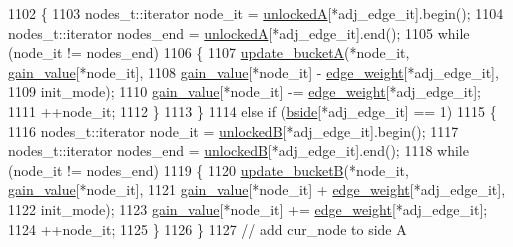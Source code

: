 \begin{DoxyCode}
1102     \{
1103         nodes\_t::iterator node\_it = \mbox{\hyperlink{classratio__cut__partition_a9e4d0ba86475bd0faa98e01c6be4dde0}{unlockedA}}[*adj\_edge\_it].begin();
1104         nodes\_t::iterator nodes\_end = \mbox{\hyperlink{classratio__cut__partition_a9e4d0ba86475bd0faa98e01c6be4dde0}{unlockedA}}[*adj\_edge\_it].end();
1105         \textcolor{keywordflow}{while} (node\_it != nodes\_end)
1106         \{
1107         \mbox{\hyperlink{classratio__cut__partition_acbd0608a7e5560a52c447711cb59a644}{update\_bucketA}}(*node\_it, \mbox{\hyperlink{classratio__cut__partition_af24ff191abbb0578f0bfc54fef5f6d45}{gain\_value}}[*node\_it],
1108             \mbox{\hyperlink{classratio__cut__partition_af24ff191abbb0578f0bfc54fef5f6d45}{gain\_value}}[*node\_it] - \mbox{\hyperlink{classratio__cut__partition_a48a85c82fb09b83c9d494d6d1232fab2}{edge\_weight}}[*adj\_edge\_it],
1109             init\_mode);
1110         \mbox{\hyperlink{classratio__cut__partition_af24ff191abbb0578f0bfc54fef5f6d45}{gain\_value}}[*node\_it] -= \mbox{\hyperlink{classratio__cut__partition_a48a85c82fb09b83c9d494d6d1232fab2}{edge\_weight}}[*adj\_edge\_it];
1111         ++node\_it;
1112         \}
1113     \}
1114     \textcolor{keywordflow}{else} \textcolor{keywordflow}{if} (\mbox{\hyperlink{classratio__cut__partition_ab9c1166efb1cbb65ff6c55bb6e3c9e6d}{bside}}[*adj\_edge\_it] == 1)
1115     \{
1116         nodes\_t::iterator node\_it = \mbox{\hyperlink{classratio__cut__partition_af7c877d8c6e9b533ab34cde1c6690b25}{unlockedB}}[*adj\_edge\_it].begin();
1117         nodes\_t::iterator nodes\_end = \mbox{\hyperlink{classratio__cut__partition_af7c877d8c6e9b533ab34cde1c6690b25}{unlockedB}}[*adj\_edge\_it].end();
1118         \textcolor{keywordflow}{while} (node\_it != nodes\_end)
1119         \{
1120         \mbox{\hyperlink{classratio__cut__partition_abe5d474e6d99c7bb200071d6484b5358}{update\_bucketB}}(*node\_it, \mbox{\hyperlink{classratio__cut__partition_af24ff191abbb0578f0bfc54fef5f6d45}{gain\_value}}[*node\_it],
1121             \mbox{\hyperlink{classratio__cut__partition_af24ff191abbb0578f0bfc54fef5f6d45}{gain\_value}}[*node\_it] + \mbox{\hyperlink{classratio__cut__partition_a48a85c82fb09b83c9d494d6d1232fab2}{edge\_weight}}[*adj\_edge\_it],
1122             init\_mode);
1123         \mbox{\hyperlink{classratio__cut__partition_af24ff191abbb0578f0bfc54fef5f6d45}{gain\_value}}[*node\_it] += \mbox{\hyperlink{classratio__cut__partition_a48a85c82fb09b83c9d494d6d1232fab2}{edge\_weight}}[*adj\_edge\_it];
1124         ++node\_it;
1125         \}
1126     \}
1127     \textcolor{comment}{// add cur\_node to side A}

\end{DoxyCode}
